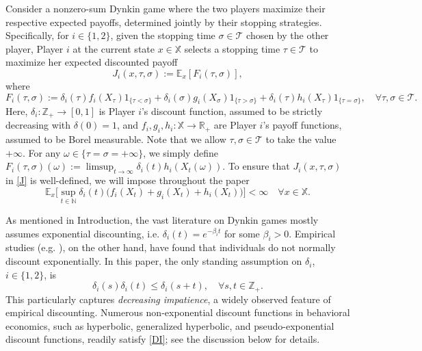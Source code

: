 \documentclass[11pt,reqno]{article}
\numberwithin{equation}{section}
\newcommand{\R}{\mathbb{R}}
\newcommand{\E}{\mathbb{E}}
\newcommand{\N}{\mathbb{N}}
\newcommand{\X}{\mathbb{X}}
\newcommand{\Z}{\mathbb{Z}}
\newcommand{\T}{\mathcal{T}}
\begin{document}
Consider a nonzero-sum Dynkin game where the two players maximize their respective expected payoffs, determined jointly by their stopping strategies. Specifically, for $i\in\{1,2\}$, given the stopping time $\sigma\in\T$ chosen by the  other player, Player $i$ at the current state $x\in\X$ selects a stopping time $\tau\in\T$ to maximize her expected discounted payoff
\begin{equation}\label{J}
J_i(x,\tau,\sigma):=\E_x[F_i(\tau,\sigma)], 
\end{equation}
where
\begin{equation}\label{F}
F_i(\tau,\sigma):=\delta_i(\tau)f_i(X_\tau)1_{\{\tau<\sigma\}}+\delta_i(\sigma)g_i(X_\sigma)1_{\{\tau>\sigma\}}+\delta_i(\tau)h_i(X_\tau)1_{\{\tau=\sigma\}},\quad \forall\tau,\sigma\in\T.
\end{equation}
Here, $\delta_i:\Z_+\to [0,1]$ is Player $i$'s discount function, assumed to be strictly decreasing with $\delta(0)=1$, and $f_i, g_i, h_i:\X\to\R_+$ are Player $i$'s payoff functions, assumed to be Borel measurable. Note that we allow $\tau, \sigma\in\T$ to take the value $+\infty$. For any $\omega\in\{\tau=\sigma=+\infty\}$, we simply define $F_i(\tau,\sigma)(\omega):= \limsup_{t\to\infty} \delta_i(t)h_i(X_t(\omega))$. To ensure that $J_i(x,\tau,\sigma)$ in \eqref{J} is well-defined, we will impose throughout the paper 
\begin{equation}\label{dominated}
\E_x\bigg[\sup_{t\in\N}\delta_i(t)\big(f_i(X_t)+g_i(X_t)+h_i(X_t)\big)\bigg]<\infty\quad \forall x\in\X.
\end{equation}

As mentioned in Introduction, the vast literature on Dynkin games mostly assumes exponential discounting, i.e. $\delta_i(t)=e^{-\beta_i t}$ for some $\beta_i>0$. Empirical studies (e.g. \cite{Thaler81, LT89}), on the other hand, have found that individuals do not normally discount exponentially. In this paper, the only standing assumption on $\delta_i$, $i\in\{1,2\}$, is
\begin{equation}\label{DI}
\delta_i(s)\delta_i(t)\le \delta_i(s+t),\quad \forall s,t\in\Z_+.%
\end{equation}
This particularly captures {\it decreasing impatience}, a widely observed feature of empirical discounting. Numerous non-exponential discount functions in behavioral economics, such as hyperbolic, generalized hyperbolic, and pseudo-exponential discount functions, readily satisfy \eqref{DI}; see the discussion below \cite[Assumption 3.12]{HN18} for details. 
\end{document}
